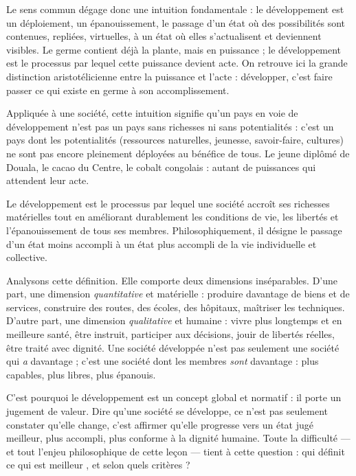 \documentclass[11pt]{article}
\newcommand{\cle}[1]{{\popxbold\color{popdark}#1}}
\newcounter{popsec}
\newcounter{popsub}
\newcommand{\courssub}[1]{%
  \stepcounter{popsub}%
  \par\vspace{9pt}\noindent{\popxbold\fontsize{11.5}{13}\selectfont\color{popink}{\color{poporange}\thepopsec.\thepopsub}\hspace{6pt}#1}\par\nopagebreak\vspace{4pt}
}
\begin{document}
Le sens commun dégage donc une intuition fondamentale : le développement est un \cle{déploiement}, un \cle{épanouissement}, le passage d'un état où des possibilités sont contenues, repliées, virtuelles, à un état où elles s'actualisent et deviennent visibles. Le germe contient déjà la plante, mais en puissance ; le développement est le processus par lequel cette puissance devient acte. On retrouve ici la grande distinction aristotélicienne entre la \cle{puissance} et l'\cle{acte} : développer, c'est faire passer ce qui existe en germe à son accomplissement.

Appliquée à une société, cette intuition signifie qu'un pays \og en voie de développement \fg{} n'est pas un pays sans richesses ni sans potentialités : c'est un pays dont les potentialités (ressources naturelles, jeunesse, savoir-faire, cultures) ne sont pas encore pleinement déployées au bénéfice de tous. Le jeune diplômé de Douala, le cacao du Centre, le cobalt congolais : autant de puissances qui attendent leur acte.

\courssub{Définition philosophique du développement}

\begin{definition}[Développement]
Le \cle{développement} est le processus par lequel une société accroît ses richesses matérielles tout en améliorant durablement les conditions de vie, les libertés et l'épanouissement de tous ses membres. Philosophiquement, il désigne le passage d'un état moins accompli à un état plus accompli de la vie individuelle et collective.
\end{definition}

Analysons cette définition. Elle comporte deux dimensions inséparables. D'une part, une dimension \emph{quantitative} et matérielle : produire davantage de biens et de services, construire des routes, des écoles, des hôpitaux, maîtriser les techniques. D'autre part, une dimension \emph{qualitative} et humaine : vivre plus longtemps et en meilleure santé, être instruit, participer aux décisions, jouir de libertés réelles, être traité avec dignité. Une société développée n'est pas seulement une société qui \emph{a} davantage ; c'est une société dont les membres \emph{sont} davantage : plus capables, plus libres, plus épanouis.

C'est pourquoi le développement est un concept \cle{global} et \cle{normatif} : il porte un jugement de valeur. Dire qu'une société se développe, ce n'est pas seulement constater qu'elle change, c'est affirmer qu'elle progresse vers un état jugé meilleur, plus accompli, plus conforme à la dignité humaine. Toute la difficulté — et tout l'enjeu philosophique de cette leçon — tient à cette question : qui définit ce qui est \og meilleur \fg{}, et selon quels critères ?
\end{document}
